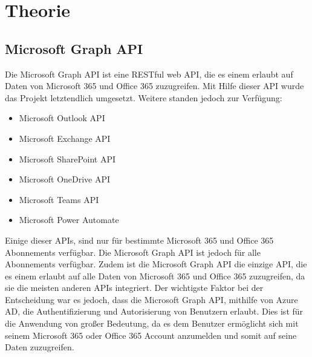 


\section{Theorie}\label{sec:theorie}

\subsection{Microsoft Graph API}\label{subsec:microsoft-graph-api}
Die Microsoft Graph API ist eine \gls{RESTful} web API, die es einem erlaubt auf Daten von Microsoft 365 und Office 365 zuzugreifen.
Mit Hilfe dieser API wurde das Projekt letztendlich umgesetzt.
Weitere standen jedoch zur Verfügung:
\begin{itemize}
    \item Microsoft Outlook API
    \item Microsoft Exchange API
    \item Microsoft SharePoint API
    \item Microsoft OneDrive API
    \item Microsoft Teams API
    \item Microsoft Power Automate
\end{itemize}
Einige dieser APIs, sind nur für bestimmte Microsoft 365 und Office 365 Abonnements verfügbar.
Die Microsoft Graph API ist jedoch für alle Abonnements verfügbar.
Zudem ist die Microsoft Graph API die einzige API, die es einem erlaubt auf alle Daten von Microsoft 365 und Office 365 zuzugreifen, da sie die meisten anderen APIs integriert.
Der wichtigste Faktor bei der Entscheidung war es jedoch, dass die Microsoft Graph API, mithilfe von Azure AD, die Authentifizierung und Autorisierung von Benutzern erlaubt. Dies ist für die Anwendung von großer Bedeutung, da es dem Benutzer ermöglicht sich mit seinem Microsoft 365 oder Office 365 Account anzumelden und somit auf seine Daten zuzugreifen.

